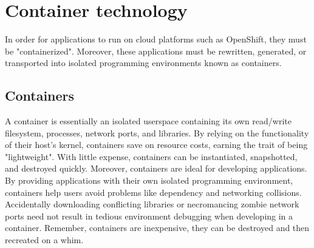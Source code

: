 \documentclass{article}
\begin{document}
\section{Container technology}
In order for applications to run on cloud platforms such as OpenShift, they must be "containerized". Moreover, these applications must be rewritten, generated, or transported into
isolated programming environments known as containers. 
\subsection{Containers}

A container is essentially an isolated userspace containing its own read/write filesystem, processes, network ports, and libraries. By relying on the functionality of their host's kernel, containers save on resource costs, earning the trait of being "lightweight". With little expense, containers can be instantiated, snapshotted, and destroyed quickly. Moreover, containers are ideal for developing applications. By providing applications with their own isolated programming environment, containers help users avoid problems like dependency and networking collisions. Accidentally downloading conflicting libraries or necromancing zombie network ports need not result in tedious environment debugging when developing in a container. Remember, containers are inexpensive, they can be destroyed and then recreated on a whim. 
\end{document}

